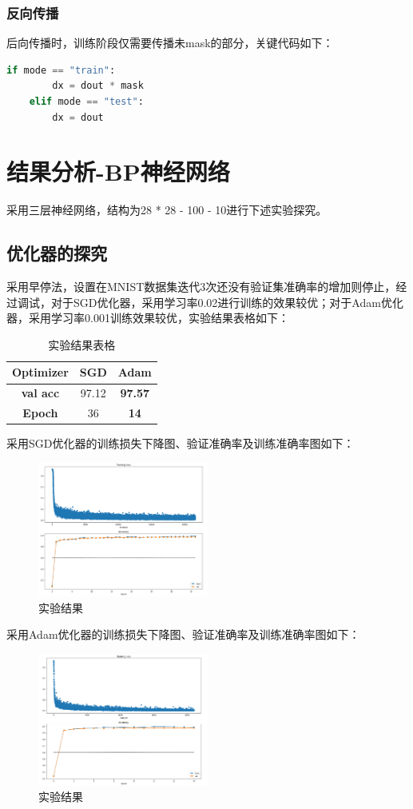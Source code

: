 \documentclass[withoutpreface,bwprint]{cumcmthesis} %
\begin{document}
\subsubsection{反向传播}
后向传播时，训练阶段仅需要传播未mask的部分，关键代码如下：
\begin{lstlisting}[language=python]
	if mode == "train":
		dx = dout * mask
	elif mode == "test":
		dx = dout
\end{lstlisting}


\section{结果分析-BP神经网络}
	采用三层神经网络，结构为28 * 28 - 100 - 10进行下述实验探究。
\subsection{优化器的探究}
	采用早停法，设置在MNIST数据集迭代3次还没有验证集准确率的增加则停止，经过调试，对于SGD优化器，采用学习率0.02进行训练的效果较优；对于Adam优化器，采用学习率0.001训练效果较优，实验结果表格如下：
	\begin{table}[H]
	\centering
	\caption{实验结果表格}
	\begin{tabular}{|c|c|c|}
	\hline
	\textbf{Optimizer} & \textbf{SGD} & \textbf{Adam}  \\ \hline
	\textbf{val acc}   & 97.12        & \textbf{97.57} \\ \hline
	\textbf{Epoch}     & 36           & \textbf{14}    \\ \hline
	\end{tabular}
	\end{table}
	采用SGD优化器的训练损失下降图、验证准确率及训练准确率图如下：
	\begin{figure}[H]
		\centering
		\includegraphics[width=0.5\textwidth]{sgd}
		\caption{实验结果}
	\end{figure}
采用Adam优化器的训练损失下降图、验证准确率及训练准确率图如下：
	\begin{figure}[H]
		\centering
		\includegraphics[width=0.5\textwidth]{adam}
		\caption{实验结果}
	\end{figure}
\end{document}
